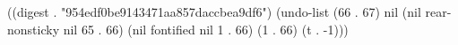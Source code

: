 
((digest . "954edf0be9143471aa857daccbea9df6") (undo-list (66 . 67) nil (nil rear-nonsticky nil 65 . 66) (nil fontified nil 1 . 66) (1 . 66) (t . -1)))
